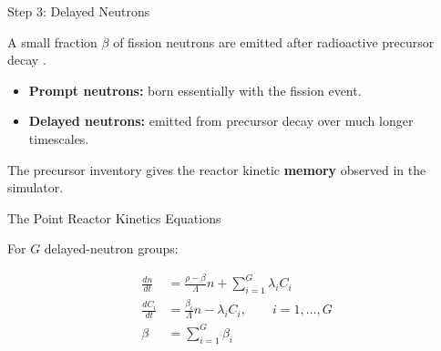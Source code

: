 \documentclass[aspectratio=169]{beamer}
\begin{document}

\begin{frame}{Step 3: Delayed Neutrons}

    A small fraction $\beta$ of fission neutrons are emitted after radioactive
    precursor decay \cite{bell1970nuclear}.

    \vspace{1em}

    \begin{itemize}

        \item
        \textbf{Prompt neutrons:}
        born essentially with the fission event.

        \item
        \textbf{Delayed neutrons:}
        emitted from precursor decay over much longer timescales.

    \end{itemize}

    \vspace{1em}

    The precursor inventory gives the reactor kinetic
    \textbf{memory} observed in the simulator.

\end{frame}



\begin{frame}{The Point Reactor Kinetics Equations}

    For $G$ delayed-neutron groups:

    \begin{align*}
        \frac{dn}{dt}
        &=
        \frac{\rho-\beta}{\Lambda}n
        +
        \sum_{i=1}^{G}\lambda_i C_i
        \\[1em]
        \frac{dC_i}{dt}
        &=
        \frac{\beta_i}{\Lambda}n
        -
        \lambda_i C_i,
        \qquad
        i=1,\ldots,G
        \\[1em]
        \beta
        &=
        \sum_{i=1}^{G}\beta_i
    \end{align*}

\end{frame}


\end{document}
